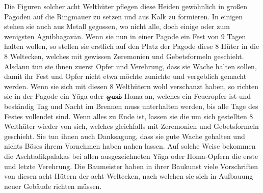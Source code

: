 \documentclass{article}
\newcommand{\TamilText}[1]{\texttamil{#1}}
\newcommand{\tam}[1]{\TamilText{#1}}
\begin{document}
Die Figuren solcher acht Welthüter pflegen diese Heiden gewöhnlich in großen Pagoden auf die Ringmauer zu setzen und aus Kalk zu formieren. In einigen stehen sie auch aus Metall gegossen, wo nicht alle, doch einige oder zum wenigsten Agnibhagav\={a}n. Wenn sie nun in einer Pagode ein Fest von 9 Tagen halten wollen, so stellen sie erstlich auf den Platz der Pagode diese 8 Hüter in die 8 Weltecken, welches mit gewissen Zeremonien und Gebetsformeln geschieht. Alsdann tun sie ihnen zuerst Opfer und Verehrung, dass sie Wache halten sollen, damit ihr Fest und Opfer nicht etwa möchte zunichte und vergeblich gemacht werden. Wenn sie sich mit diesen 8 Welthütern wohl verschanzt haben, so richten sie in der Pagode ein Y\={a}ga oder \tam{ஒமம்} Homa an, welches ein Feueropfer ist und beständig Tag und Nacht im Brennen muss unterhalten werden, bis alle Tage des Festes vollendet sind. Wenn alles zu Ende ist, lassen sie die um sich gestellten 8 Welthüter wieder von sich, welches gleichfalls mit Zeremonien und Gebetsformeln geschieht. Sie tun ihnen auch Danksagung, dass sie gute Wache gehalten und nichts Böses ihrem Vornehmen haben nahen lassen. Auf solche Weise bekommen die Aschtadikpalakas bei allen ausgezeichneten Y\={a}ga oder Homa-Opfern die erste und letzte Verehrung. Die Baumeister haben in ihrer Baukunst viele Vorschriften von diesen acht Hütern der acht Weltecken, nach welchen sie sich in Aufbauung neuer Gebäude richten müssen.

\begin{center}
\end{center}
\end{document}
